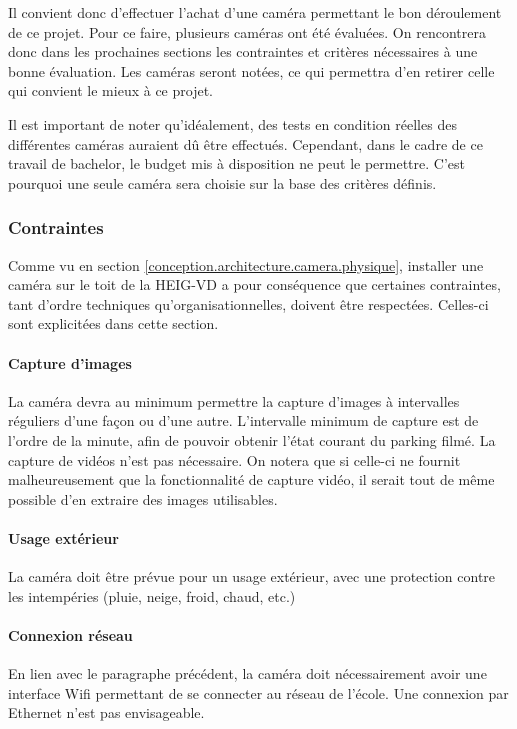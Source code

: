 Il convient donc d'effectuer l'achat d'une caméra permettant le bon déroulement de ce projet. Pour ce faire, plusieurs caméras ont été évaluées. On rencontrera donc dans les prochaines sections les contraintes et critères nécessaires à une bonne évaluation. Les caméras seront notées, ce qui permettra d'en retirer celle qui convient le mieux à ce projet.

Il est important de noter qu'idéalement, des tests en condition réelles des différentes caméras auraient dû être effectués. Cependant, dans le cadre de ce travail de bachelor, le budget mis à disposition ne peut le permettre. C'est pourquoi une seule caméra sera choisie sur la base des critères définis.

\subsubsection{Contraintes}\label{conception.techno.camera.contraintes}
Comme vu en section \ref{conception.architecture.camera.physique}, installer une caméra sur le toit de la HEIG-VD a pour conséquence que certaines contraintes, tant d'ordre techniques qu'organisationnelles, doivent être respectées. Celles-ci sont explicitées dans cette section.

\paragraph{Capture d'images}
La caméra devra au minimum permettre la capture d'images à intervalles réguliers d'une façon ou d'une autre. L'intervalle minimum de capture est de l'ordre de la minute, afin de pouvoir obtenir l'état courant du parking filmé. La capture de vidéos n'est pas nécessaire. On notera que si celle-ci ne fournit malheureusement que la fonctionnalité de capture vidéo, il serait tout de même possible d'en extraire des images utilisables. 

\paragraph{Usage extérieur}
La caméra doit être prévue pour un usage extérieur, avec une protection contre les intempéries (pluie, neige, froid, chaud, etc.)

\paragraph{Connexion réseau}
En lien avec le paragraphe précédent, la caméra doit nécessairement avoir une interface Wifi permettant de se connecter au réseau de l'école. Une connexion par Ethernet n'est pas envisageable.

